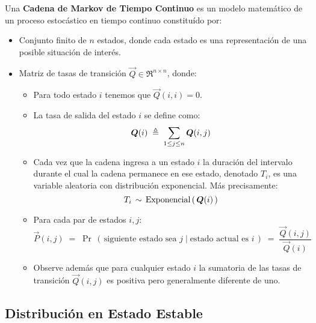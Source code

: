 \documentclass[ 10pt, xcolor = dvipsnames]{beamer}
\begin{document}
\begin{frame}[allowframebreaks]
\frametitle{\insertsubsection}

Una \textbf{Cadena de Markov de Tiempo Continuo} es un modelo matem\'atico de un proceso estoc\'astico en tiempo continuo constitu\'ido por: 
\begin{itemize}
\item Conjunto finito de $n$ estados, donde cada estado es una representaci\'on de una posible situaci\'on de inter\'es. 
\item Matriz de tasas de transici\'on $\vec{Q} \in \Re^{n \times n}$, donde: 
\begin{itemize}
\item Para todo estado $i$ tenemos que $\vec{Q}(i,i) = 0$. 
\item La tasa de salida del estado $i$ se define como: 
\[
{\boldsymbol{Q}}(i) \; \triangleq \; \sum_{ 1 \leq j \leq n } {\boldsymbol{Q}}(i,j)
\]
\framebreak
\item Cada vez que la cadena ingresa a un estado $i$ la duraci\'on del intervalo \linebreak durante el cual la cadena permanece en ese estado, denotado $T_i$, es una variable aleatoria con distribuci\'on exponencial. M\'as precisamente: 
\[
T_i \, \sim \, \text{Exponencial} \, ( \, {\boldsymbol{Q}}(i) \, )
\]
\item Para cada par de estados $i,j$: 
\[
\vec{P}(i,j) \; = \; 
\Pr \, ( \, \text{siguiente estado sea } j \mid \text{estado actual es } i \, ) \; = \; 
\frac{ \vec{Q}(i,j) }{ \; \vec{Q}(i) \; }
\]
\item Observe adem\'as que para cualquier estado $i$ la sumatoria de las tasas de transici\'on $\vec{Q}(i,j)$ es positiva pero generalmente diferente de uno. 
\end{itemize}
\end{itemize}

\end{frame}

\subsection{Distribuci\'on en Estado Estable}
\end{document}
